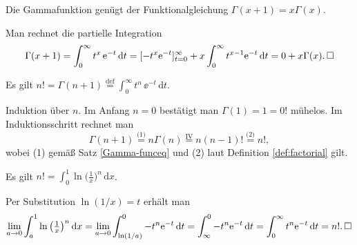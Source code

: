 \begin{Satz}\label{Gamma-funceq}
Die Gammafunktion genügt der Funktionalgleichung
$\Gamma(x+1)=x\Gamma(x)$.
\end{Satz}
\begin{Beweis}
Man rechnet die partielle Integration
\[\Gamma(x+1) = \int_0^\infty t^x\,\mathrm e^{-t}\,\mathrm dt =
[-t^x\mathrm e^{-t}]_{t=0}^\infty + x\int_0^\infty t^{x-1}\mathrm e^{-t}\,\mathrm dt
= 0 + x\Gamma(x).\,\square\]
\end{Beweis}

\begin{Satz}
Es gilt $n! = \Gamma(n+1) \stackrel{\text{def}}= \int_0^\infty t^n\,\ee^{-t}\,\mathrm dt$.
\end{Satz}
\begin{Beweis}
Induktion über $n$. Im Anfang $n=0$ bestätigt man $\Gamma(1)=1=0!$
mühelos. Im Induktionsschritt rechnet man
\[\Gamma(n+1) \stackrel{\text{(1)}}= n\Gamma(n)
\stackrel{\mathrm{IV}}= n(n-1)! \stackrel{\text{(2)}}= n!,\]
wobei (1) gemäß Satz \ref{Gamma-funceq} und (2) laut Definition
\ref{def:factorial} gilt.\,\qedsymbol
\end{Beweis}

\begin{Satz}
Es gilt $n! = \int_0^1 \ln\big(\frac{1}{x}\big)^n\,\mathrm dx$.
\end{Satz}
\begin{Beweis}
Per Substitution $\ln(1/x)=t$ erhält man
\[
\lim_{a\to 0}\int_a^1 \ln\big(\tfrac{1}{x}\big)^n\,\mathrm dx
= \lim_{a\to 0}\int_{\ln(1/a)}^0 -t^n\mathrm e^{-t}\,\mathrm dt
= \int_\infty^0 -t^n\mathrm e^{-t}\,\mathrm dt = \int_0^\infty t^n\mathrm e^{-t}\,\mathrm dt
= n!.\,\square
\]
\end{Beweis}

